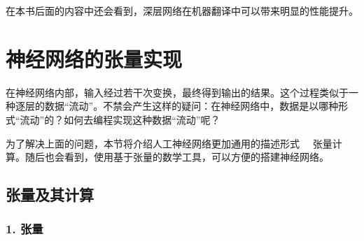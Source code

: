 \parinterval 在本书后面的内容中还会看到，深层网络在机器翻译中可以带来明显的性能提升。


\sectionnewpage
\section{神经网络的张量实现}

\parinterval 在神经网络内部，输入经过若干次变换，最终得到输出的结果。这个过程类似于一种逐层的数据“流动”。不禁会产生这样的疑问：在神经网络中，数据是以哪种形式“流动”的？如何去编程实现这种数据“流动”呢？

\parinterval 为了解决上面的问题，本节将介绍人工神经网络更加通用的描述形式 \ \dash \ 张量计算。随后也会看到，使用基于张量的数学工具，可以方便的搭建神经网络。



\subsection{ 张量及其计算}


\subsubsection{1. 张量}

